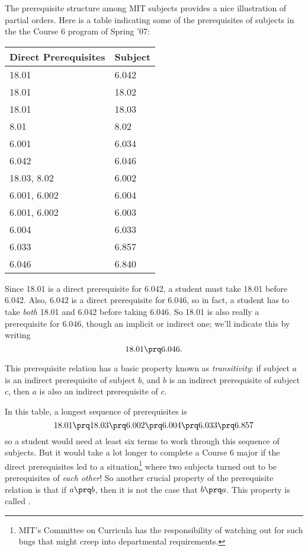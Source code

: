 The prerequisite structure among MIT subjects provides a nice illustration
of partial orders.  Here is a table indicating some of the prerequisites of
subjects in the the Course 6 program of Spring '07:
\begin{center}
\begin{tabular}{|l|l|}
\hline
Direct Prerequisites & Subject\\ \hline
18.01 & 6.042\\ \hline
 18.01 & 18.02\\ \hline
 18.01 & 18.03\\ \hline
 8.01 & 8.02\\ \hline
 6.001 & 6.034\\ \hline
 6.042 & 6.046\\ \hline
 18.03, 8.02 & 6.002\\ \hline
 6.001, 6.002 & 6.004\\ \hline
 6.001, 6.002 & 6.003\\ \hline
 6.004 & 6.033\\ \hline
 6.033 & 6.857\\ \hline
 6.046 & 6.840\\ \hline
\end{tabular}
\end{center}

Since 18.01 is a direct prerequisite for 6.042, a student must take 18.01
before 6.042.  Also, 6.042 is a direct prerequisite for 6.046, so in fact,
a student has to take \emph{both} 18.01 and 6.042 before taking 6.046.  So
18.01 is also really a prerequisite for 6.046, though an implicit or
indirect one; we'll indicate this by writing
\[
18.01 \prq 6.046.
\]

This prerequisite relation has a basic property known as
\emph{transitivity}: if subject $a$ is an indirect prerequisite of
subject $b$, and $b$ is an indirect prerequisite of subject $c$, then
$a$ is also an indirect prerequisite of $c$.

In this table, a longest sequence of prerequisites is
\[
18.01 \prq 18.03 \prq 6.002 \prq 6.004 \prq 6.033 \prq 6.857
\]
so a student would need at least six terms to work through this sequence
of subjects.  But it would take a lot longer to complete a Course 6 major
if the direct prerequisites led to a situation\footnote{MIT's Committee on
Curricula has the responsibility of watching out for such bugs that might
creep into departmental requirements.} where two subjects turned out to be
prerequisites of \emph{each other}!  So another crucial property of the
prerequisite relation is that if $a \prq b$, then it is not the case that
$b \prq a$.  This property is called .


